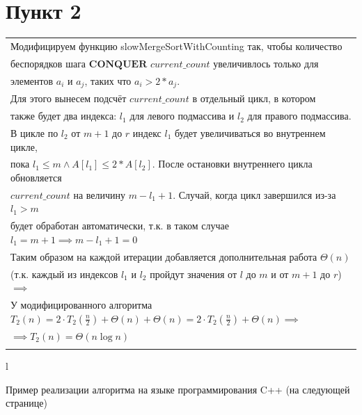 \documentclass[11pt,a4paper]{article} %
\begin{document}
\pagebreak

\section*{Пункт 2}

\begin{tabular}{l}
    Модифицируем функцию slowMergeSortWithCounting так, чтобы количество \\
    беспорядков шага $ \textbf{CONQUER} $ $ current\_count $ увеличивлось только для \\
    элементов $ a_i $ и $ a_j $, таких что $ a_i > 2 * a_j $. \\
    Для этого вынесем подсчёт $ current\_count $ в отдельный цикл, в котором \\
    также будет два индекса: $ l_1 $ для левого подмассива и $ l_2 $ для правого подмассива. \\
    В цикле по $ l_2 $ от $ m + 1 $ до $ r $ индекс $ l_1 $ будет увеличиваться во внутреннем цикле, \\
    пока $ l_1 \le m \wedge A[l_1] \le 2 * A[l_2] $. После остановки внутреннего цикла обновляется \\
    $ current\_count $ на величину $ m - l_1 + 1 $. Случай, когда цикл завершился из-за $ l_1 > m $ \\
    будет обработан автоматически, т.к. в таком случае $ l_1 = m + 1 \implies m - l_1 + 1 = 0 $ \\
    Таким образом на каждой итерации добавляется дополнительная работа $ \Theta(n) $ \\
    (т.к. каждый из индексов $ l_1 $ и $ l_2 $ пройдут значения от $ l $ до $ m $ и от $ m + 1 $ до $ r $) $ \implies $ \\
    У модифицированного алгоритма $ T_2(n) = 2 \cdot T_2(\frac{n}{2}) + \Theta(n) + \Theta(n) = 2 \cdot T_2(\frac{n}{2}) + \Theta(n) \implies $ \\
    $ \implies T_2(n) = \Theta(n \log n) $
    \\
    \\
\end{tabular}{l}


Пример реализации алгоритма на языке программирования C++ (на следующей странице)
\end{document}
